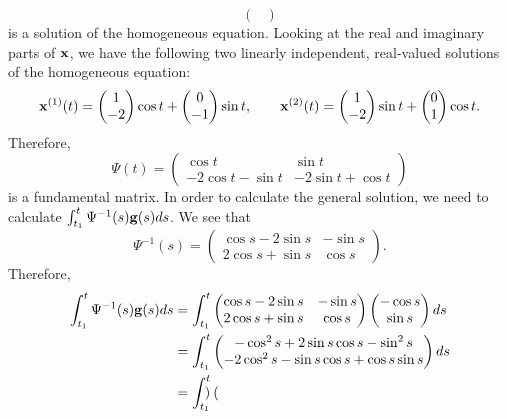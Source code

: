 \documentclass[11pt,a4paper]{article}
\begin{document}
\begin{enumerate}
$$\begin{pmatrix}
		\end{pmatrix}
		$$
		is a solution of the homogeneous equation. Looking at the real and imaginary parts of $\vb{x}$, we have the following two linearly independent, real-valued solutions of the homogeneous equation:
		$$
		\vb{x}^{(1)}(t) = 
		\begin{pmatrix}
			1\\
			-2
		\end{pmatrix}\cos t +
		\begin{pmatrix}
			0\\
			-1
		\end{pmatrix}\sin t,\qquad \vb{x}^{(2)}(t) =
		\begin{pmatrix}
			1\\
			-2
		\end{pmatrix}\sin t + 
		\begin{pmatrix}
			0\\
			1
		\end{pmatrix}\cos t.
		$$
		Therefore,
		$$
		\Psi(t) = 
		\begin{pmatrix}
			\cos t & \sin t\\
			-2\cos t - \sin t & -2\sin t + \cos t
		\end{pmatrix}
		$$
		is a fundamental matrix. In order to calculate the general solution, we need to calculate $\int_{t_1}^t \Psi^{-1}(s)\vb{g}(s)ds$. We see that
		$$
		\Psi^{-1}(s) =
		\begin{pmatrix}
			\cos s - 2\sin s & -\sin s\\
			2\cos s + \sin s & \cos s
		\end{pmatrix}.
		$$
		Therefore,
		\begin{align*}
			\int_{t_1}^t \Psi^{-1}(s)\vb{g}(s)ds
			&= \int_{t_1}^t
			\begin{pmatrix}
				\cos s - 2\sin s & -\sin s\\
				2\cos s + \sin s & \cos s
			\end{pmatrix}
			\begin{pmatrix}
				-\cos s\\
				\sin s
			\end{pmatrix}ds\\
			&= \int_{t_1}^t
			\begin{pmatrix}
				-\cos^2 s + 2\sin s\cos s - \sin^2s\\
				-2\cos^2s -\sin s\cos s + \cos s\sin s
			\end{pmatrix}ds\\
			&= \int_{t_1}^t
			\begin{pmatrix}

\end{pmatrix}
\end{align*}
\end{enumerate}
\end{document}
